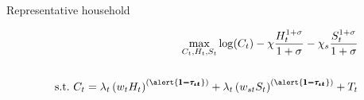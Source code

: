 \documentclass[11pt,aspectratio=169]{beamer}
\begin{document}
\begin{frame}{Representative household}
	\hypertarget{backhh}{}
	\vspace{2mm}
	\begin{minipage}[t!]{1\textwidth}
		\begin{align*}
			\max_{C_t, H_{t}, S_{t}} \log(C_t)-\chi\frac{H_{t}^{1+\sigma}}{1+\sigma}-\chi_s\frac{S_{t}^{1+\sigma}}{1+\sigma}
			\\
			\vspace{4mm}
			\\
			\text{s.t.}\ C_t=\lambda_t\left(w_{t}H_{t}\right)^{(\alert{\pmb{1-\tau_{\iota t}}})}+\lambda_t \left(w_{st}S_t\right)^{(\alert{\pmb{1-\tau_{\iota t}}})}+T_t%
		\end{align*}
	\end{minipage}
	

\end{frame}
\end{document}

